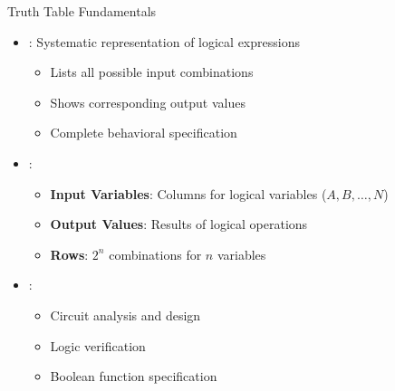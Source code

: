 \begin{frame}{Truth Table Fundamentals}
\begin{itemize}
\item {}: Systematic representation of logical expressions
\begin{itemize}
\item Lists all possible input combinations
\item Shows corresponding output values
\item Complete behavioral specification
\end{itemize}
\vspace{0.5cm}
\item {}:
\begin{itemize}
\item \textbf{Input Variables}: Columns for logical variables ($A, B, \ldots, N$)
\item \textbf{Output Values}: Results of logical operations
\item \textbf{Rows}: $2^n$ combinations for $n$ variables
\end{itemize}
\vspace{0.3cm}
\item {}:
\begin{itemize}
\item Circuit analysis and design
\item Logic verification
\item Boolean function specification
\end{itemize}
\end{itemize}
\end{frame}

